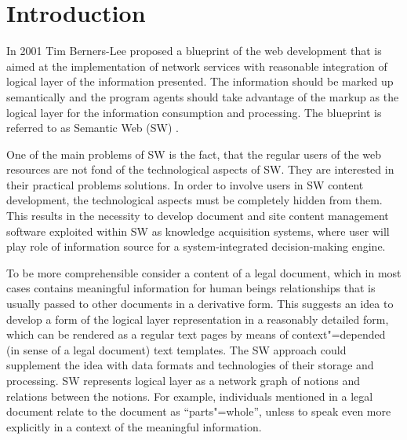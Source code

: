 \documentclass[conference]{IEEEtran}
\begin{document}




%
\IEEEpeerreviewmaketitle



\section{Introduction}
In 2001 Tim Berners-Lee proposed a blueprint \cite{b1} of the web development that is aimed at the implementation of network services with reasonable integration of logical layer of the information presented. The information should be marked up semantically and the program agents should take advantage of the markup as the logical layer for the information consumption and processing. The blueprint is referred to as Semantic Web (SW) \cite{b1}.

One of the main problems of SW is the fact, that the regular users of the web resources are not fond of the technological aspects of SW. They are interested in their practical problems solutions. In order to involve users in SW content development, the technological aspects must be completely hidden from them. This results in the necessity to develop document and site content management software exploited within SW as knowledge acquisition systems, where user will play role of information source for a system-integrated decision-making engine.

To be more comprehensible consider a content of a legal document, which in most cases contains meaningful information for human beings relationships that is usually passed to other documents in a derivative form. This suggests an idea to develop a form of the logical layer representation in a reasonably detailed form, which can be rendered as a regular text pages by means of context"=depended (in sense of a legal document) text templates. The SW approach could supplement the idea with data formats and technologies of their storage and processing. SW represents logical layer as a network graph of notions and relations between the notions. For example, individuals mentioned in a legal document relate to the document as “parts"=whole”, unless to speak even more explicitly in a context of the meaningful information.
\end{document}
